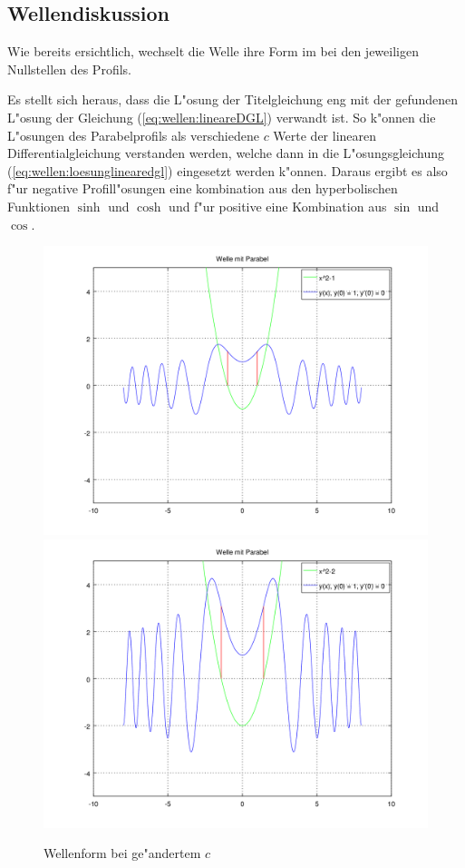 \subsection{Wellendiskussion}
\label{sec:wellen:diskussionwellenform}

Wie bereits ersichtlich, wechselt die Welle ihre Form im bei den jeweiligen 
Nullstellen des Profils.

Es stellt sich heraus, dass die L"osung der Titelgleichung eng mit der 
gefundenen L"osung der Gleichung (\ref{eq:wellen:lineareDGL}) verwandt ist. So 
k"onnen die L"osungen des Parabelprofils als verschiedene $c$ Werte der 
linearen Differentialgleichung verstanden werden, welche dann in die 
L"osungsgleichung (\ref{eq:wellen:loesunglinearedgl}) eingesetzt werden 
k"onnen. Daraus ergibt es also f"ur negative Profill"osungen eine kombination 
aus den hyperbolischen Funktionen $\sinh$ und $\cosh$ und f"ur positive eine 
Kombination aus $\sin$ und $\cos$.

\begin{figure}
	\includegraphics[scale=0.35]{./wellen/images/varc/cneg1.png}
	\includegraphics[scale=0.35]{./wellen/images/varc/cneg2.png}
	\caption{Wellenform bei ge"andertem $c$}
	\label{fig:wellen:variablec}
\end{figure}

